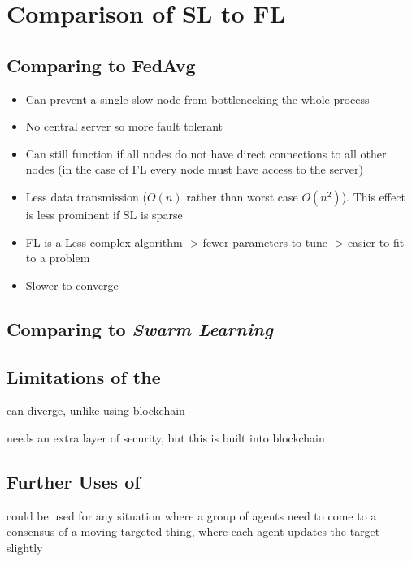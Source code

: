\section{Comparison of SL to FL}

\subsection{Comparing \SL to FedAvg}

\begin{itemize}
	\item Can prevent a single slow node from bottlenecking the whole process
	\item No central server so more fault tolerant
	\item Can still function if all nodes do not have direct connections to all other nodes (in the case of FL every node must have access to the server)
\end{itemize}


\begin{itemize}
	\item Less data transmission ($O(n)$ rather than worst case $O(n^2)$). This effect is less prominent if SL is sparse
	\item FL is a Less complex algorithm -> fewer parameters to tune -> easier to fit to a problem
	\item Slower to converge
\end{itemize}

\subsection{Comparing \SL to \emph{Swarm Learning}}

\subsection{Limitations of the \SL}
can diverge, unlike using blockchain

needs an extra layer of security, but this is built into blockchain

\subsection{Further Uses of \SL}
could be used for any situation where a group of agents need to come to a consensus of a moving targeted thing, where each agent updates the target slightly